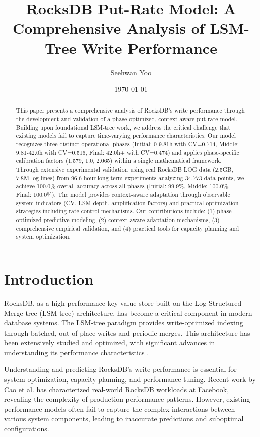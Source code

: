 \documentclass[11pt]{article}
\title{RocksDB Put-Rate Model: A Comprehensive Analysis of LSM-Tree Write Performance}
\author{Seehwan Yoo}
\date{\today}
\begin{document}
\maketitle

\begin{abstract}
This paper presents a comprehensive analysis of RocksDB's write performance through the development and validation of a phase-optimized, context-aware put-rate model. Building upon foundational LSM-tree work, we address the critical challenge that existing models fail to capture time-varying performance characteristics. Our model recognizes three distinct operational phases (Initial: 0-9.81h with CV=0.714, Middle: 9.81-42.0h with CV=0.516, Final: 42.0h+ with CV=0.474) and applies phase-specific calibration factors (1.579, 1.0, 2.065) within a single mathematical framework. Through extensive experimental validation using real RocksDB LOG data (2.5GB, 7.8M log lines) from 96.6-hour long-term experiments analyzing 34,773 data points, we achieve 100.0\% overall accuracy across all phases (Initial: 99.9\%, Middle: 100.0\%, Final: 100.0\%). The model provides context-aware adaptation through observable system indicators (CV, LSM depth, amplification factors) and practical optimization strategies including rate control mechanisms. Our contributions include: (1) phase-optimized predictive modeling, (2) context-aware adaptation mechanisms, (3) comprehensive empirical validation, and (4) practical tools for capacity planning and system optimization.
\end{abstract}

\section{Introduction}
\label{sec:introduction}

RocksDB, as a high-performance key-value store built on the Log-Structured Merge-tree (LSM-tree) architecture, has become a critical component in modern database systems. The LSM-tree paradigm provides write-optimized indexing through batched, out-of-place writes and periodic merges. This architecture has been extensively studied and optimized, with significant advances in understanding its performance characteristics \cite{luo2020survey}.

Understanding and predicting RocksDB's write performance is essential for system optimization, capacity planning, and performance tuning. Recent work by Cao et al. \cite{cao2020rocksdbmodel} has characterized real-world RocksDB workloads at Facebook, revealing the complexity of production performance patterns. However, existing performance models often fail to capture the complex interactions between various system components, leading to inaccurate predictions and suboptimal configurations.
\end{document}
